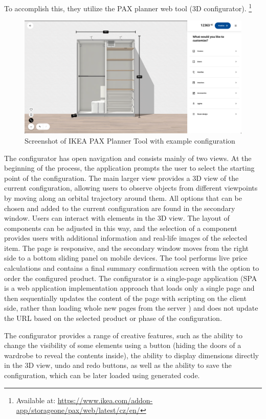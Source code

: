 To accomplish this, they utilize the PAX planner web tool (3D configurator). \footnote{Available at: \url{https://www.ikea.com/addon-app/storageone/pax/web/latest/cz/en/}} 

\begin{figure}[h]
\centering
\includegraphics[width=\textwidth]{images/analysis_ikea-pax.png}
\caption{Screenshot of IKEA PAX Planner Tool with example configuration}
\end{figure}

The configurator has open navigation and consists mainly of two views. At the beginning of the process, the application prompts the user to select the starting point of the configuration. The main larger view provides a 3D view of the current configuration, allowing users to observe objects from different viewpoints by moving along an orbital trajectory around them. All options that can be chosen and added to the current configuration are found in the secondary window. Users can interact with elements in the 3D view. The layout of components can be adjusted in this way, and the selection of a component provides users with additional information and real-life images of the selected item.
The page is responsive, and the secondary window moves from the right side to a bottom sliding panel on mobile devices.
The tool performs live price calculations and contains a final summary confirmation screen with the option to order the configured product. The configurator is a single-page application (SPA is a web application implementation approach that loads only a single page and then sequentially updates the content of the page with scripting on the client side, rather than loading whole new pages from the server \cite{Fink2014}) and does not update the URL based on the selected product or phase of the configuration.

The configurator provides a range of creative features, such as the ability to change the visibility of some elements using a button (hiding the doors of a wardrobe to reveal the contents inside), the ability to display dimensions directly in the 3D view, undo and redo buttons, as well as the ability to save the configuration, which can be later loaded using generated code.


